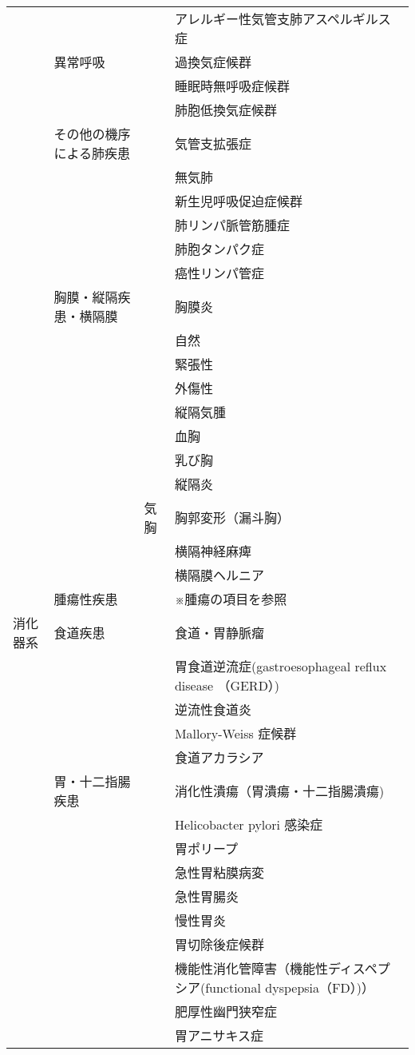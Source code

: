 \begin{xltabular}{\linewidth}{XXXX}
 &  &  & アレルギー性気管支肺アスペルギルス症 \\
 & 異常呼吸 &  & 過換気症候群 \\
 &  &  & 睡眠時無呼吸症候群 \\
 &  &  & 肺胞低換気症候群 \\
 & その他の機序による肺疾患 &  & 気管支拡張症 \\
 &  &  & 無気肺 \\
 &  &  & 新生児呼吸促迫症候群 \\
 &  &  & 肺リンパ脈管筋腫症 \\
 &  &  & 肺胞タンパク症 \\
 &  &  & 癌性リンパ管症 \\
 & 胸膜・縦隔疾患・横隔膜 &  & 胸膜炎 \\
 &  &  & 自然 \\
 &  &  & 緊張性 \\
 &  &  & 外傷性 \\
 &  &  & 縦隔気腫 \\
 &  &  & 血胸 \\
 &  &  & 乳び胸 \\
 &  &  & 縦隔炎 \\
 &  & 気胸 & 胸郭変形（漏斗胸） \\
 &  &  & 横隔神経麻痺 \\
 &  &  & 横隔膜ヘルニア \\
 & 腫瘍性疾患 &  & ※腫瘍の項目を参照 \\
消化器系 & 食道疾患 &  & 食道・胃静脈瘤 \\
 &  &  & 胃食道逆流症(gastroesophageal reflux disease （GERD）) \\
 &  &  & 逆流性食道炎 \\
 &  &  & Mallory-Weiss 症候群 \\
 &  &  & 食道アカラシア \\
 & 胃・十二指腸疾患 &  & 消化性潰瘍（胃潰瘍・十二指腸潰瘍) \\
 &  &  & Helicobacter pylori 感染症 \\
 &  &  & 胃ポリープ \\
 &  &  & 急性胃粘膜病変 \\
 &  &  & 急性胃腸炎 \\
 &  &  & 慢性胃炎 \\
 &  &  & 胃切除後症候群 \\
 &  &  & 機能性消化管障害（機能性ディスペプシア(functional dyspepsia（FD）)） \\
 &  &  & 肥厚性幽門狭窄症 \\
 &  &  & 胃アニサキス症 \\

\end{xltabular}
